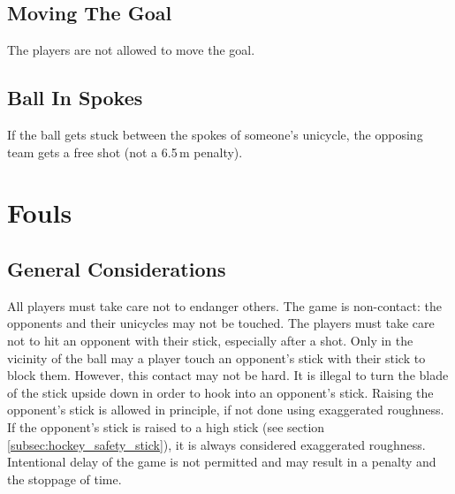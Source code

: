 \subsection{Moving The Goal}
The players are not allowed to move the goal.

\subsection{Ball In Spokes}
If the ball gets stuck between the spokes of someone's unicycle, the opposing team gets a free shot (not a 6.5\,m penalty).

\section{Fouls}

\subsection{General Considerations}
All players must take care not to endanger others.
The game is non-contact: the opponents and their unicycles may not be touched.
The players must take care not to hit an opponent with their stick, especially after a shot.
Only in the vicinity of the ball may a player touch an opponent's stick with their stick to block them.
However, this contact may not be hard.
It is illegal to turn the blade of the stick upside down in order to hook into an opponent's stick.
Raising the opponent's stick is allowed in principle, if not done using exaggerated roughness.
If the opponent's stick is raised to a high stick (see section \ref{subsec:hockey_safety_stick}), it is always considered exaggerated roughness.
Intentional delay of the game is not permitted and may result in a penalty and the stoppage of time.

